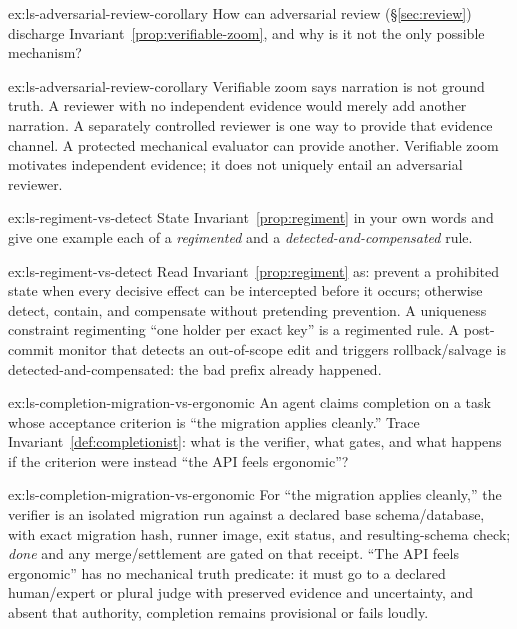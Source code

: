 \documentclass[11pt,a4paper]{article}
\theoremstyle{definition}
\theoremstyle{plain}
\begin{document}

\begin{pdexercise}[kind=Check,rating=1]{ex:ls-adversarial-review-corollary}
How can adversarial review (\S\ref{sec:review}) discharge
Invariant~\ref{prop:verifiable-zoom}, and why is it not the only possible mechanism?
\end{pdexercise}
\begin{pdsolution}{ex:ls-adversarial-review-corollary}
Verifiable zoom says narration is not ground truth. A reviewer with no independent evidence would merely add another narration. A separately controlled reviewer is one way to provide that evidence channel.
A protected mechanical evaluator can provide another. Verifiable zoom motivates
independent evidence; it does not uniquely entail an adversarial reviewer.
\end{pdsolution}
\begin{pdexercise}[kind=Check,rating=1]{ex:ls-regiment-vs-detect}
State Invariant~\ref{prop:regiment} in your own words and give one example each of a
\emph{regimented} and a \emph{detected-and-compensated} rule.
\end{pdexercise}
\begin{pdsolution}{ex:ls-regiment-vs-detect}
Read Invariant~\ref{prop:regiment} as: prevent a prohibited state when every decisive effect can be intercepted before it occurs; otherwise detect, contain, and compensate without pretending prevention. A uniqueness constraint regimenting ``one holder per exact key'' is a regimented rule. A post-commit monitor that detects an out-of-scope edit and triggers rollback/salvage is detected-and-compensated: the bad prefix already happened.
\end{pdsolution}
\begin{pdexercise}[kind=Trace,rating=2]{ex:ls-completion-migration-vs-ergonomic}
An agent claims completion on a task whose acceptance criterion is ``the
migration applies cleanly.'' Trace Invariant~\ref{def:completionist}: what is the
verifier, what gates, and what happens if the criterion were instead ``the API feels
ergonomic''?
\end{pdexercise}
\begin{pdsolution}{ex:ls-completion-migration-vs-ergonomic}
For ``the migration applies cleanly,'' the verifier is an isolated migration run against a declared base schema/database, with exact migration hash, runner image, exit status, and resulting-schema check; \emph{done} and any merge/settlement are gated on that receipt. ``The API feels ergonomic'' has no mechanical truth predicate: it must go to a declared human/expert or plural judge with preserved evidence and uncertainty, and absent that authority, completion remains provisional or fails loudly.
\end{pdsolution}
\end{document}
